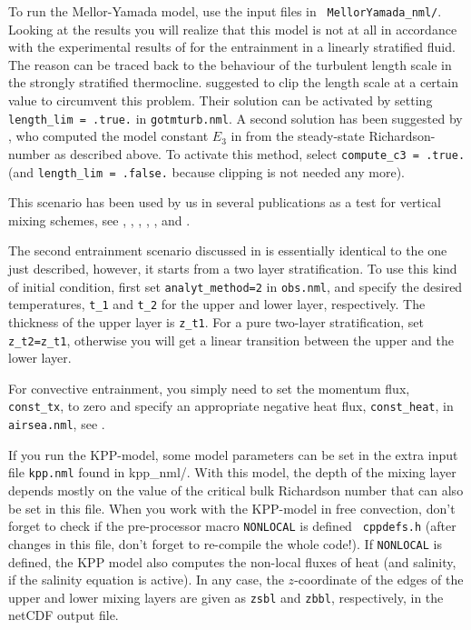 To run the Mellor-Yamada model, use the input files in {\tt
MellorYamada\_nml/}. Looking at the results you will realize that this
model is not at all in accordance with the experimental results of
\cite{Price79} for the entrainment in a linearly stratified fluid. The
reason can be traced back to the behaviour of the turbulent length
scale in the strongly stratified thermocline.  \cite{Galperinetal88}
suggested to clip the length scale at a certain value to circumvent
this problem. Their solution can be activated by setting {\tt
length\_lim = .true.}  in {\tt gotmturb.nml}.  A second solution has
been suggested by \cite{Burchard2001c}, who computed the model
constant $E_3$ in  from the steady-state Richardson-number as
described above. To activate this method, select {\tt compute\_c3 =
.true.} (and {\tt length\_lim = .false.} because clipping is not
needed any more).

This scenario has been used by us in several publications as a test
for vertical mixing schemes, see \cite{Burchardetal98},
\cite{Burchardetal99}, \cite{BurchardPetersen99},
\cite{BurchardBolding2001} \cite{BurchardDeleersnijder2001},
\cite{DeleersnijderBurchard2003}, and \cite{Umlaufetal2003}.

The second entrainment scenario discussed in
\cite{UmlaufBurchard2005a} is essentially identical to the one just
described, however, it starts from a two layer stratification.  To use
this kind of initial condition, first set {\tt analyt\_method=2} in
{\tt obs.nml}, and specify the desired temperatures, {\tt t\_1} and
{\tt t\_2} for the upper and lower layer, respectively. The thickness
of the upper layer is {\tt z\_t1}. For a pure two-layer
stratification, set {\tt z\_t2=z\_t1}, otherwise you will get a linear
transition between the upper and the lower layer.

For convective entrainment, you simply need to set the momentum flux,
{\tt const\_tx}, to zero and specify an appropriate negative heat
flux, {\tt const\_heat}, in {\tt airsea.nml}, see \cite{UmlaufBurchard2005a}. 

If you run the KPP-model, some model parameters can be set in the
extra input file {\tt kpp.nml} found in {kpp\_nml/}. With this model,
the depth of the mixing layer depends mostly on the value of the
critical bulk Richardson number that can also be set in this file.
When you work with the KPP-model in free convection, don't forget to
check if the pre-processor macro {\tt NONLOCAL} is defined {\tt
cppdefs.h} (after changes in this file, don't forget to re-compile the
whole code!).  If {\tt NONLOCAL} is defined, the KPP model also
computes the non-local fluxes of heat (and salinity, if the salinity
equation is active). In any case, the $z$-coordinate of the
edges of the upper and lower mixing layers are given as {\tt zsbl} and
{\tt zbbl}, respectively, in the netCDF output file.


